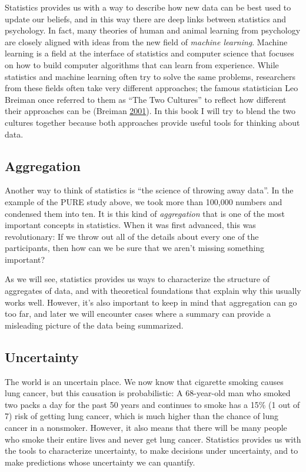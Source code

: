 \documentclass[12pt,]{book}
\theoremstyle{definition}
\theoremstyle{definition}
\theoremstyle{definition}
\theoremstyle{remark}
\begin{document}
Statistics provides us with a way to describe how new data can be best used to update our beliefs, and in this way there are deep links between statistics and psychology. In fact, many theories of human and animal learning from psychology are closely aligned with ideas from the new field of \emph{machine learning}. Machine learning is a field at the interface of statistics and computer science that focuses on how to build computer algorithms that can learn from experience. While statistics and machine learning often try to solve the same problems, researchers from these fields often take very different approaches; the famous statistician Leo Breiman once referred to them as ``The Two Cultures'' to reflect how different their approaches can be (Breiman \protect\hyperlink{ref-breiman2001}{2001}). In this book I will try to blend the two cultures together because both approaches provide useful tools for thinking about data.

\hypertarget{aggregation}{%
\subsection{Aggregation}\label{aggregation}}

Another way to think of statistics is ``the science of throwing away data''. In the example of the PURE study above, we took more than 100,000 numbers and condensed them into ten. It is this kind of \emph{aggregation} that is one of the most important concepts in statistics. When it was first advanced, this was revolutionary: If we throw out all of the details about every one of the participants, then how can we be sure that we aren't missing something important?

As we will see, statistics provides us ways to characterize the structure of aggregates of data, and with theoretical foundations that explain why this usually works well. However, it's also important to keep in mind that aggregation can go too far, and later we will encounter cases where a summary can provide a misleading picture of the data being summarized.

\hypertarget{uncertainty}{%
\subsection{Uncertainty}\label{uncertainty}}

The world is an uncertain place. We now know that cigarette smoking causes lung cancer, but this causation is probabilistic: A 68-year-old man who smoked two packs a day for the past 50 years and continues to smoke has a 15\% (1 out of 7) risk of getting lung cancer, which is much higher than the chance of lung cancer in a nonsmoker. However, it also means that there will be many people who smoke their entire lives and never get lung cancer. Statistics provides us with the tools to characterize uncertainty, to make decisions under uncertainty, and to make predictions whose uncertainty we can quantify.
\end{document}
